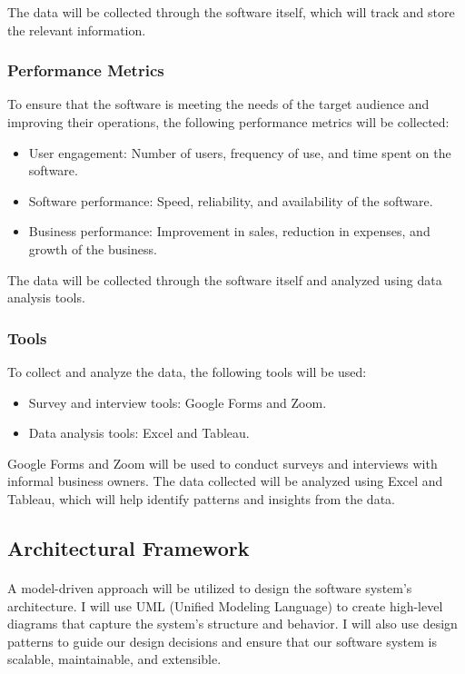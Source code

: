 \documentclass{article}
\begin{document}
The data will be collected through the software itself, which will track and store the relevant information.

\subsubsection{Performance Metrics}
To ensure that the software is meeting the needs of the target audience and improving their operations, the following performance metrics will be collected:

\begin{itemize}
    \item User engagement: Number of users, frequency of use, and time spent on the software.
    \item Software performance: Speed, reliability, and availability of the software.
    \item Business performance: Improvement in sales, reduction in expenses, and growth of the business.
\end{itemize}

The data will be collected through the software itself and analyzed using data analysis tools. 

\subsubsection{Tools}
To collect and analyze the data, the following tools will be used:

\begin{itemize}
    \item Survey and interview tools: Google Forms and Zoom.
    \item Data analysis tools: Excel and Tableau.
\end{itemize}

Google Forms and Zoom will be used to conduct surveys and interviews with informal business owners. The data collected will be analyzed using Excel and Tableau, which will help identify patterns and insights from the data.
\newpage


\subsection{Architectural Framework}

\paragraph*{}
A model-driven approach will be utilized to design the software system's architecture. I will use UML (Unified Modeling Language) to create high-level diagrams that capture the system's structure and behavior. I will also use design patterns to guide our design decisions and ensure that our software system is scalable, maintainable, and extensible.
\end{document}
